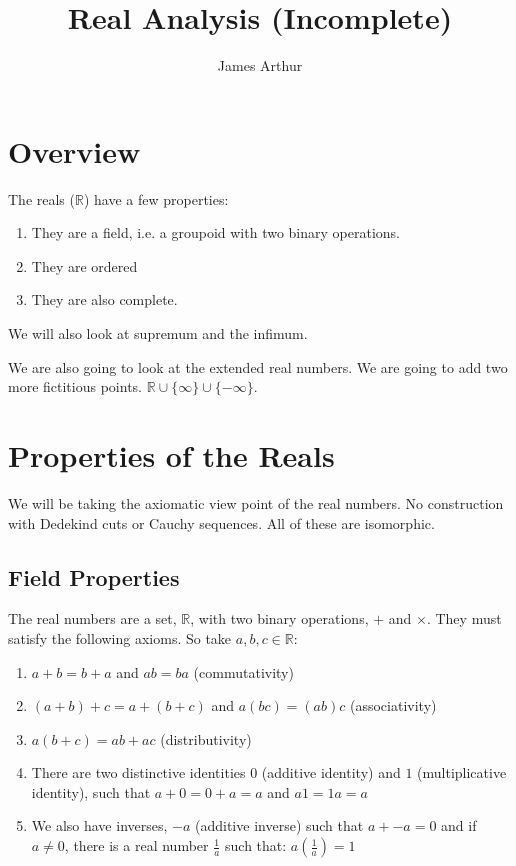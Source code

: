 \documentclass{article}
\title{Real Analysis (Incomplete)}
\author{James Arthur}
\newcommand{\R}{\mathbb{R}}
\begin{document}
\maketitle
\tableofcontents
\newpage



\section{Overview}

The reals ($\R$) have a few properties:
\begin{enumerate}
  \item They are a field, i.e. a groupoid with {\color{blue}two binary operations}.
  \item They are ordered
  \item They are also {\color{blue}complete}.
\end{enumerate}
We will also look at {\color{blue}supremum} and the {\color{blue}infimum}.

We are also going to look at the {\color{blue}extended real numbers}. We are going to add two more fictitious points. $\R \cup \{ \infty \} \cup \{ -\infty \}$.

\section{Properties of the Reals}
We will be taking the axiomatic view point of the real numbers. No construction with {\color{blue}Dedekind cuts} or {\color{blue}Cauchy sequences}. All of these are isomorphic.

\subsection{Field Properties}
The real numbers are a set, $\R$, with two binary operations, $+$ and $\times$. They must satisfy the following axioms. So take $a, b, c \in \R$:
\begin{enumerate}
  \item $a + b = b + a$ and $ab = ba$ ({\color{blue}commutativity})
  \item $(a + b) + c = a + (b + c)$ and $a(bc) = (ab)c$ ({\color{blue}associativity})
  \item $a(b + c) = ab + ac$ ({\color{blue}distributivity})
  \item There are two distinctive identities $0$ ({\color{blue}additive identity}) and $1$ ({\color{blue}multiplicative identity}), such that $a + 0 = 0 + a = a$ and $a1 = 1a = a$
  \item We also have inverses, $-a$ ({\color{blue}additive inverse}) such that $a + -a = 0$ and if $a \neq 0$, there is a real number $\frac{1}{a}$ such that: $a(\frac{1}{a})=1$
\end{enumerate}
\end{document}
